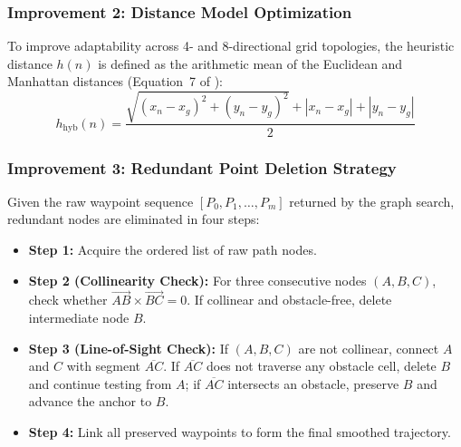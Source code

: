 \documentclass[conference]{IEEEtran}
\begin{document}
\subsubsection{Improvement 2: Distance Model Optimization}
To improve adaptability across 4- and 8-directional grid topologies, the heuristic distance $h(n)$ is defined as the arithmetic mean of the Euclidean and Manhattan distances (Equation~7 of \cite{cao2026adaptive}):
\begin{equation}
    h_{\text{hyb}}(n) = \frac{\sqrt{(x_n - x_g)^2 + (y_n - y_g)^2} + |x_n - x_g| + |y_n - y_g|}{2}
    \label{eq:hybrid_h}
\end{equation}

\subsubsection{Improvement 3: Redundant Point Deletion Strategy}
Given the raw waypoint sequence $[P_0, P_1, \dots, P_m]$ returned by the graph search, redundant nodes are eliminated in four steps:
\begin{itemize}
    \item \textbf{Step 1:} Acquire the ordered list of raw path nodes.
    \item \textbf{Step 2 (Collinearity Check):} For three consecutive nodes $(A, B, C)$, check whether $\vec{AB} \times \vec{BC} = 0$. If collinear and obstacle-free, delete intermediate node $B$.
    \item \textbf{Step 3 (Line-of-Sight Check):} If $(A, B, C)$ are not collinear, connect $A$ and $C$ with segment $\overline{AC}$. If $\overline{AC}$ does not traverse any obstacle cell, delete $B$ and continue testing from $A$; if $\overline{AC}$ intersects an obstacle, preserve $B$ and advance the anchor to $B$.
    \item \textbf{Step 4:} Link all preserved waypoints to form the final smoothed trajectory.
\end{itemize}
\end{document}
